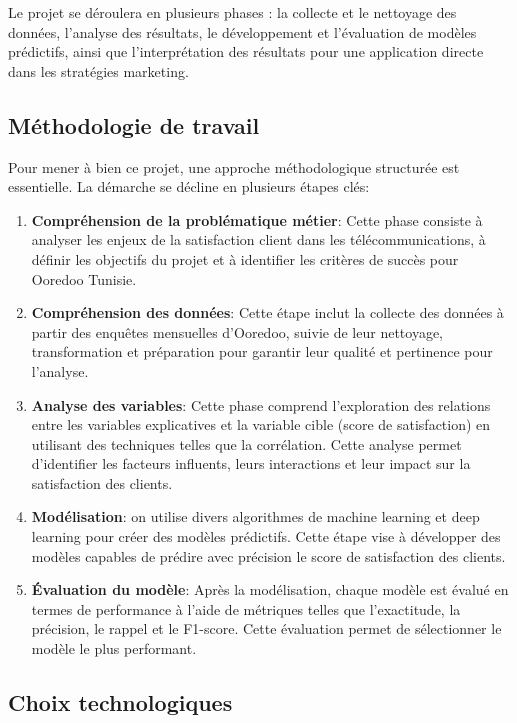 Le projet se déroulera en plusieurs phases : la collecte et le nettoyage des données, l’analyse des résultats, le développement et l’évaluation de modèles prédictifs, ainsi que l'interprétation des résultats pour une application directe dans les stratégies marketing.
\subsection{Méthodologie de travail}

Pour mener à bien ce projet, une approche méthodologique structurée est essentielle. La démarche se décline en plusieurs étapes clés:

\begin{enumerate}
    \item \textbf{Compréhension de la problématique métier}: Cette phase consiste à analyser les enjeux de la satisfaction client dans les télécommunications, à définir les objectifs du projet et à identifier les critères de succès pour Ooredoo Tunisie.
    
    \item \textbf{Compréhension des données}: Cette étape inclut la collecte des données à partir des enquêtes mensuelles d'Ooredoo, suivie de leur nettoyage, transformation et préparation pour garantir leur qualité et pertinence pour l'analyse.
    
    \item \textbf{Analyse des variables}: Cette phase comprend l'exploration des relations entre les variables explicatives et la variable cible (score de satisfaction) en utilisant des techniques telles que la corrélation. Cette analyse permet d'identifier les facteurs influents, leurs interactions et leur impact sur la satisfaction des clients.
    
    \item \textbf{Modélisation}: on utilise divers algorithmes de machine learning et deep learning pour créer des modèles prédictifs. Cette étape vise à développer des modèles capables de prédire avec précision le score de satisfaction des clients.
    
    \item \textbf{Évaluation du modèle}: Après la modélisation, chaque modèle est évalué en termes de performance à l'aide de métriques telles que l'exactitude, la précision, le rappel et le F1-score. Cette évaluation permet de sélectionner le modèle le plus performant.
\end{enumerate}

\subsection{Choix technologiques}

